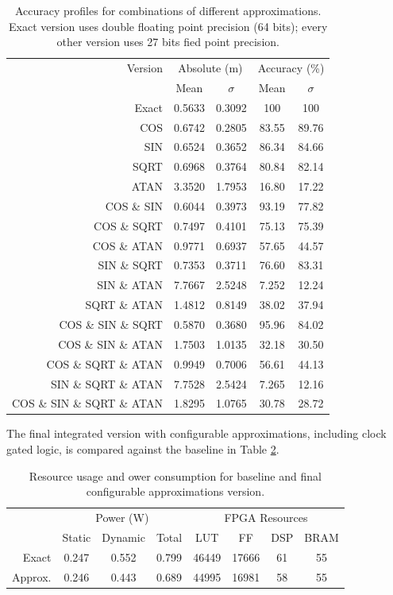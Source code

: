 \begin{table}[h]
\begin{tabular}{r c c c c}
\toprule
Version & \multicolumn{2}{c}{Absolute (m)} & \multicolumn{2}{c}{Accuracy (\%)}\\
 & Mean & $\sigma$ & Mean & $\sigma$\\
\hline
Exact	& 0.5633 & 0.3092 & 100 & 100\\
\hline
COS & 						0.6742	& 0.2805	& 83.55 & 89.76 \\
SIN & 						0.6524	& 0.3652	& 86.34 & 84.66 \\
SQRT & 						0.6968	& 0.3764	& 80.84 & 82.14 \\
ATAN & 						3.3520	& 1.7953	& 16.80 & 17.22 \\
COS \& SIN & 				0.6044	& 0.3973	& 93.19 & 77.82 \\
COS \& SQRT& 				0.7497	& 0.4101	& 75.13 & 75.39 \\
COS \& ATAN & 				0.9771	& 0.6937	& 57.65 & 44.57 \\
SIN \& SQRT & 				0.7353	& 0.3711	& 76.60 & 83.31 \\
SIN \& ATAN & 				7.7667	& 2.5248	& 7.252 & 12.24 \\
SQRT \& ATAN & 				1.4812	& 0.8149	& 38.02 & 37.94 \\
COS \& SIN \& SQRT & 		0.5870	& 0.3680	& 95.96 & 84.02 \\
COS \& SIN \& ATAN& 		1.7503	& 1.0135	& 32.18 & 30.50 \\
COS \& SQRT \& ATAN& 		0.9949	& 0.7006	& 56.61 & 44.13 \\
SIN \& SQRT \& ATAN  & 		7.7528	& 2.5424	& 7.265 & 12.16 \\
COS \& SIN \& SQRT \& ATAN &1.8295 	& 1.0765	& 30.78 & 28.72 \\
\hline
\end{tabular}
\caption{Accuracy profiles for combinations of different approximations. Exact version uses double floating point precision (64 bits); every other version uses 27 bits fied point precision.}
\label{table:acc_profiles}
\end{table}

\par The final integrated version with configurable approximations, including clock gated logic, is compared against the baseline in Table \ref{table:integrated}.

\begin{table}[h]
\begin{tabular}{r c c c c c c c}
\toprule
 & \multicolumn{3}{c}{Power (W)} & \multicolumn{4}{c}{FPGA Resources}\\
 & Static & Dynamic & Total & LUT & FF & DSP & BRAM\\
\hline
Exact & 0.247 & 0.552 & 0.799 & 46449 & 17666 & 61 & 55\\
Approx. & 0.246 & 0.443 & 0.689 & 44995 & 16981 & 58 & 55\\
\hline
\end{tabular}
\caption{Resource usage and ower consumption for baseline and final configurable approximations version.}
\label{table:integrated}
\end{table}


